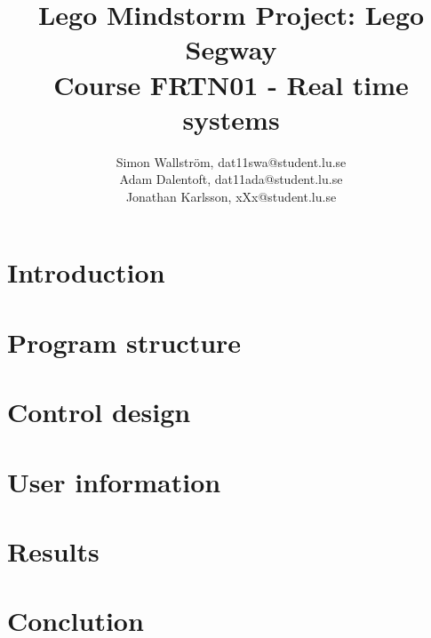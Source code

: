 \documentclass[a4paper]{article}
\title{Lego Mindstorm Project: Lego Segway\\
Course FRTN01 - Real time systems}
\author{Simon Wallström, dat11swa@student.lu.se\\
Adam Dalentoft, dat11ada@student.lu.se\\
Jonathan Karlsson, xXx@student.lu.se}
\begin{document}

\maketitle
\thispagestyle{empty}
\newpage
\setcounter{page}{1}
\tableofcontents
\newpage
\section{Introduction}


\section{Program structure}


\section{Control design}


\section{User information}


\section{Results}


\section{Conclution}
\end{document}
